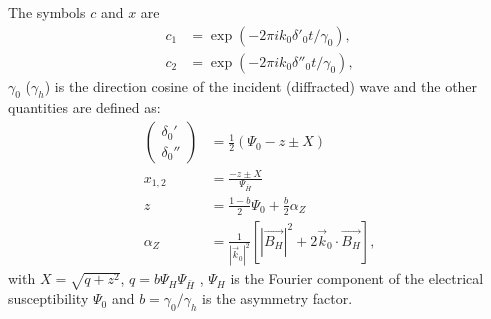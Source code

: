 \documentclass{iucr}
\begin{document}
The symbols $c$ and $x$ are
\begin{subequations}
\begin{align}
c_1 &=\exp(-2\pi i  k_0 \delta'_0 t /\gamma_0), 
 \nonumber \\
 c_2 &=\exp(-2\pi i  k_0 \delta''_0 t /\gamma_0), 
\end{align}
\end{subequations}
$\gamma_0$ ($\gamma_h$) is the direction cosine of the incident (diffracted) 
wave and the other quantities are defined as:
\begin{subequations}
\begin{align}
	\left( \begin{array}{ll}
               \delta_0' \nonumber \\
               \delta_0''
	       \end{array} 
	\right)
	&= \frac{1}{2} \left( \Psi_0 - z\pm X \right)
\nonumber \\
    x_{1,2}
	&= \frac{- z\pm X}{\Psi_{\bar{H}}}
 \nonumber \\
	z &= \frac{1-b}{2} \Psi_0 + \frac{b}{2} \alpha_Z 
 \nonumber \\
	\alpha_Z &= \frac{1}{|\vec{k}_0|^2} 
              \left[ |\vec{B_H}|^2 +
	       2 \vec{k}_0 \cdot \vec{B_H} \right], \nonumber
\end{align}
\end{subequations}
with $X=\sqrt{q+z^2}$, $q=b\Psi_H\Psi_{\bar{H}}$ , 
$\Psi_H$ is the Fourier component of the
electrical susceptibility $\Psi_0$ and $b=\gamma_0/\gamma_h$ is the asymmetry
factor.
\end{document}
